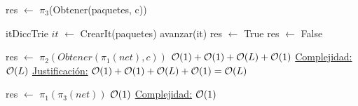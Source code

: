 \begin{Algoritmos}
\begin{algorithm}
\begin{algorithmic}[1]
   \State res $\gets$ $\pi_3$(Obtener(paquetes, c))
  \EndProcedure
\end{algorithmic}


\begin{algorithmic}[1]
   \State itDiccTrie $it$ $\gets$ CrearIt(paquetes)
   \State avanzar(it)
	\EndWhile
	\State res $\gets$   True
	\Else 
	\State res $\gets$ False
	\EndIf 
  \EndProcedure
\end{algorithmic}

\begin{algorithmic}[1]
    \State res $\gets$ $\pi_2(Obtener(\pi_1(net),c))$ \Comment $\mathcal{O}(1)+\mathcal{O}(1)+\mathcal{O}(L)+\mathcal{O}(1)$
  \EndProcedure
  \underline{Complejidad:} $\mathcal{O}(L)$
 \underline{Justificación:} $\mathcal{O}(1)+\mathcal{O}(1)+\mathcal{O}(L)+\mathcal{O}(1) = \mathcal{O}(L)$

\end{algorithmic}

\begin{algorithmic}[1]
   \State res $\gets$   $\pi_1(\pi_3(net))$ \Comment $\mathcal{O}(1)$
  \EndProcedure
  \underline{Complejidad:} $\mathcal{O}(1)$
\end{algorithmic}


\end{algorithm}

\end{Algoritmos}

